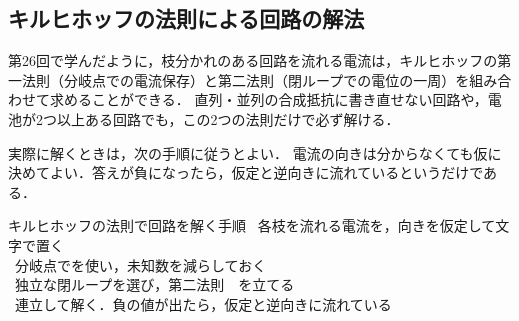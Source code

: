 %
%
%

\setcounter{nombre}{15}

\subsection{キルヒホッフの法則による回路の解法}

第26回で学んだように，枝分かれのある回路を流れる電流は，キルヒホッフの第一法則（分岐点での電流保存）と第二法則（閉ループでの電位の一周）を組み合わせて求めることができる．
直列・並列の合成抵抗に書き直せない回路や，電池が2つ以上ある回路でも，この2つの法則だけで必ず解ける．

実際に解くときは，次の手順に従うとよい．
電流の向きは分からなくても仮に決めてよい．{\gtfamily 答えが負になったら，仮定と逆向きに流れている}というだけである．

\bsNeed{44mm}
\begin{matome}{キルヒホッフの法則で回路を解く手順}
 \ 各枝を流れる電流を，向きを仮定して文字で置く\\
 \ 分岐点でを使い，未知数を減らしておく\\
 \ 独立な閉ループを選び，第二法則\ \ を立てる\\
 \ 連立して解く．負の値が出たら，仮定と逆向きに流れている
\end{matome}

